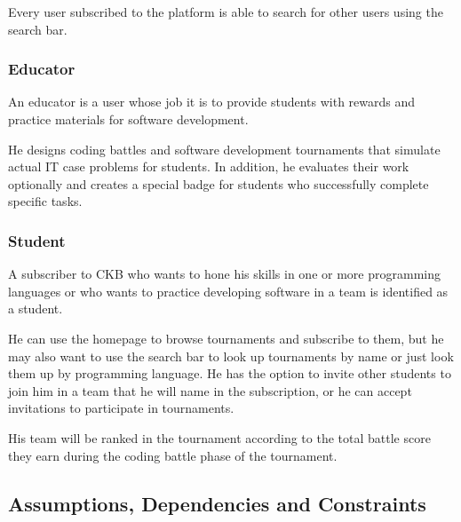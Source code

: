 Every user subscribed to the platform is able to search for other users using the search bar.

\subsubsection{Educator}
An educator is a user whose job it is to provide students with rewards and practice materials for software development.

He designs coding battles and software development tournaments that simulate actual IT case problems for students. In addition, he evaluates their work optionally and creates a special badge for students who successfully complete 
specific tasks.

\subsubsection{Student}
A subscriber to CKB who wants to hone his skills in one or more programming languages or who wants to practice developing software in a team is identified as a student.

He can use the homepage to browse tournaments and subscribe to them, but he may also want to use the search bar to look up tournaments by name or just look them up by programming language. He has the option to invite other students
to join him in a team that he will name in the subscription, or he can accept invitations to participate in tournaments.

His team will be ranked in the tournament according to the total battle score they earn during the coding battle phase of the tournament.

\subsection{Assumptions, Dependencies and Constraints}

